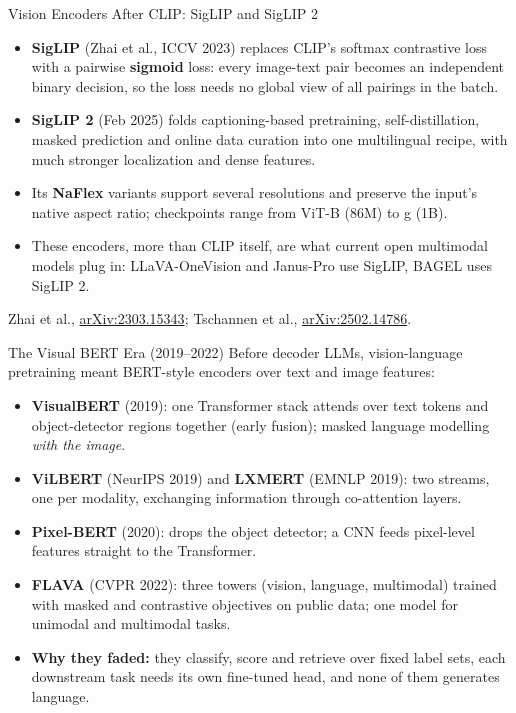 \begin{frame}{Vision Encoders After CLIP: SigLIP and SigLIP 2}
  \begin{itemize}
    \item[{\color{red}\textbullet}] \textbf{SigLIP} (Zhai et al., ICCV 2023) replaces CLIP's softmax contrastive loss
      with a pairwise \textbf{sigmoid} loss: every image-text pair becomes an independent binary
      decision, so the loss needs no global view of all pairings in the batch.
    \item[{\color{red}\textbullet}] \textbf{SigLIP 2} (Feb 2025) folds captioning-based pretraining, self-distillation,
      masked prediction and online data curation into one multilingual recipe, with much stronger
      localization and dense features.
    \item[{\color{red}\textbullet}] Its \textbf{NaFlex} variants support several resolutions and preserve the input's
      native aspect ratio; checkpoints range from ViT-B (86M) to g (1B).
    \item[{\color{red}\textbullet}] These encoders, more than CLIP itself, are what current open multimodal models
      plug in: LLaVA-OneVision and Janus-Pro use SigLIP, BAGEL uses SigLIP 2.
  \end{itemize}
  \vspace{0.4em}
  {\scriptsize Zhai et al., \href{https://arxiv.org/abs/2303.15343}{arXiv:2303.15343};
  Tschannen et al., \href{https://arxiv.org/abs/2502.14786}{arXiv:2502.14786}.}
\end{frame}

\begin{frame}{The Visual BERT Era (2019--2022)}
  Before decoder LLMs, vision-language pretraining meant BERT-style encoders over text and image features:
  \begin{itemize}
    \item[{\color{red}\textbullet}] \textbf{VisualBERT} (2019): one Transformer stack attends over text tokens and
      object-detector regions together (early fusion); masked language modelling \emph{with the image}.
    \item[{\color{red}\textbullet}] \textbf{ViLBERT} (NeurIPS 2019) and \textbf{LXMERT} (EMNLP 2019): two streams, one
      per modality, exchanging information through co-attention layers.
    \item[{\color{red}\textbullet}] \textbf{Pixel-BERT} (2020): drops the object detector; a CNN feeds pixel-level
      features straight to the Transformer.
    \item[{\color{red}\textbullet}] \textbf{FLAVA} (CVPR 2022): three towers (vision, language, multimodal) trained
      with masked and contrastive objectives on public data; one model for unimodal and multimodal tasks.
    \item[{\color{red}\textbullet}] \textbf{Why they faded:} they classify, score and retrieve over fixed label sets,
      each downstream task needs its own fine-tuned head, and none of them generates language.
  \end{itemize}
\end{frame}

